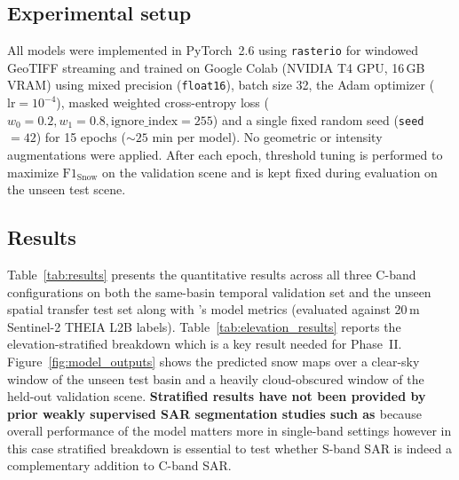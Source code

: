 \documentclass{article}
\begin{document}
\subsection{Experimental setup}
All models were implemented in PyTorch~2.6 using \texttt{rasterio} for windowed GeoTIFF streaming and trained on Google Colab (NVIDIA T4 GPU, 16\,GB VRAM) using mixed precision (\texttt{float16}), batch size 32, the Adam optimizer ($\text{lr} = 10^{-4}$), masked weighted cross-entropy loss ($w_0=0.2, w_1=0.8, \text{ignore\_index}=255$) and a single fixed random seed (\texttt{seed} $= 42$) for 15 epochs ($\sim 25\text{ min}$ per model). No geometric or intensity augmentations were applied. After each epoch, threshold tuning is performed to maximize $\text{F1}_{\text{Snow}}$ on the validation scene and is kept fixed during evaluation on the unseen test scene.

\subsection{Results}
Table~\ref{tab:results} presents the quantitative results across all three C-band configurations on both the same-basin temporal validation set and the unseen spatial transfer test set along with \citet{briand2026weakly}'s model metrics (evaluated against 20\,m Sentinel-2 THEIA L2B labels). Table~\ref{tab:elevation_results} reports the elevation-stratified breakdown which is a key result needed for Phase~II. Figure~\ref{fig:model_outputs} shows the predicted snow maps over a clear-sky window of the unseen test basin and a heavily cloud-obscured window of the held-out validation scene. \textbf{Stratified results have not been provided by prior weakly supervised SAR segmentation studies such as \citet{briand2026weakly}} because overall performance of the model matters more in single-band settings however in this case stratified breakdown is essential to test whether S-band SAR is indeed a complementary addition to C-band SAR.
\end{document}

